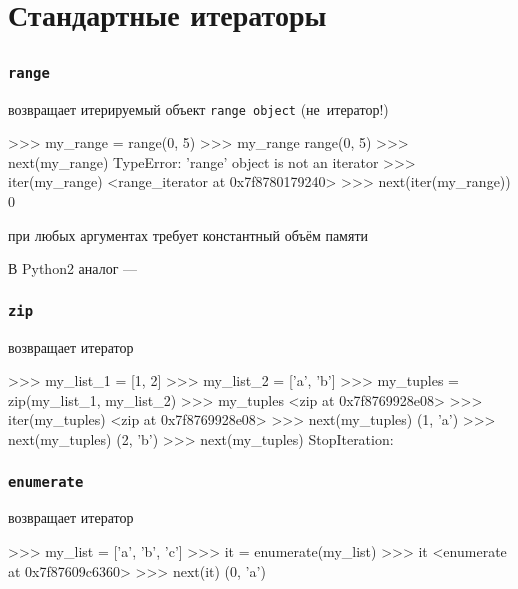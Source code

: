 \documentclass[fleqn, xcolor=x11names]{beamer}
\begin{document}
\section{Стандартные итераторы}
\subsection*{}
\begin{frame}[fragile]\frametitle{\texttt{range}}

 возвращает итерируемый объект \texttt{range object} (не~итератор!)

\begin{pcode}
>>> my_range = range(0, 5)
>>> my_range
range(0, 5)
>>> next(my_range)
TypeError: 'range' object is not an iterator
>>> iter(my_range)
<range_iterator at 0x7f8780179240>
>>> next(iter(my_range))
0
\end{pcode}

 при любых аргументах требует константный объём памяти

\hfill

В Python2 аналог  --- 
\end{frame}

\begin{frame}[fragile]\frametitle{\texttt{zip}}

 возвращает итератор

\begin{pcode}
>>> my_list_1 = [1, 2]
>>> my_list_2 = ['a', 'b']
>>> my_tuples = zip(my_list_1, my_list_2)
>>> my_tuples
<zip at 0x7f8769928e08>
>>> iter(my_tuples)
<zip at 0x7f8769928e08>
>>> next(my_tuples)
(1, 'a')
>>> next(my_tuples)
(2, 'b')
>>> next(my_tuples)
StopIteration: 
\end{pcode}

\end{frame}

\begin{frame}[fragile]\frametitle{\texttt{enumerate}}
 возвращает итератор

\hfill
\begin{pcode}
>>> my_list = ['a', 'b', 'c']
>>> it = enumerate(my_list)
>>> it
<enumerate at 0x7f87609c6360>
>>> next(it)
(0, 'a')
\end{pcode}

\end{frame}
\end{document}
